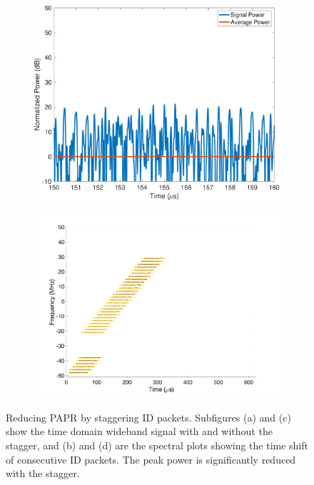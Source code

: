 \begin{figure}[!h]
\begin{subfigure}{0.48\textwidth}
        \caption{}
    \end{subfigure}
    \medskip
    \begin{subfigure}{0.48\textwidth}
        \includegraphics[width=\textwidth]{hyperscanner/plots/power_multi_bt.pdf}
        \caption{}
    \end{subfigure}
    \hfill
    \begin{subfigure}{0.48\textwidth}
        \includegraphics[width=\textwidth]{hyperscanner/plots/stft_multi_bt2.pdf}
        \caption{}
    \end{subfigure}
    \captionsetup{justification=centering}
    \caption{Reducing PAPR by staggering ID packets. Subfigures (a) and (c) show the time domain wideband signal with and without the stagger, and (b) and (d) are the spectral plots showing the time shift of consecutive ID packets. The peak power is significantly reduced with the stagger.}
    \label{fig:hyperscanner:stagger}
\end{figure}

